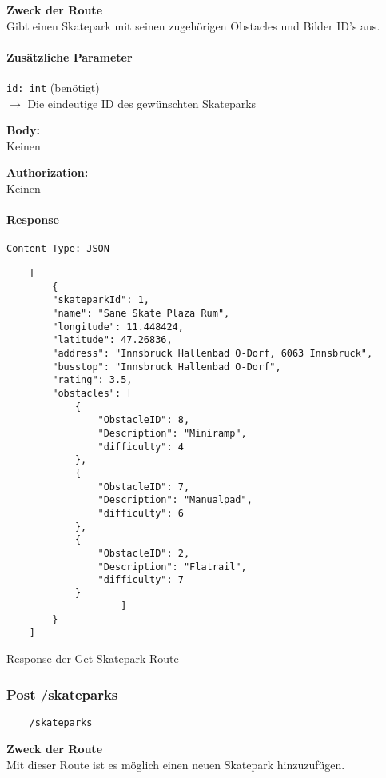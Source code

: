 \textbf{Zweck der Route} \\
Gibt einen Skatepark mit seinen zugehörigen Obstacles und Bilder ID's aus.




\paragraph{Zusätzliche Parameter}
\lstinline{id: int} (benötigt) \\
$\rightarrow$ Die eindeutige ID des gewünschten Skateparks


\textbf{Body:} \\
Keinen

\textbf{Authorization:} \\
Keinen

\paragraph{Response}
\begin{code}
    \lstinline{Content-Type: JSON}
    \begin{lstlisting}
    [
        {
        "skateparkId": 1,
        "name": "Sane Skate Plaza Rum",
        "longitude": 11.448424,
        "latitude": 47.26836,
        "address": "Innsbruck Hallenbad O-Dorf, 6063 Innsbruck",
        "busstop": "Innsbruck Hallenbad O-Dorf",
        "rating": 3.5,
        "obstacles": [
            {
                "ObstacleID": 8,
                "Description": "Miniramp",
                "difficulty": 4
            },
            {
                "ObstacleID": 7,
                "Description": "Manualpad",
                "difficulty": 6
            },
            {
                "ObstacleID": 2,
                "Description": "Flatrail",
                "difficulty": 7
            }
                    ]
        }
    ]
    \end{lstlisting}
    \caption{Response der Get Skatepark-Route}
\end{code}
\pagebreak


\subsubsection{Post /skateparks}

\begin{lstlisting}
    /skateparks
\end{lstlisting}

\textbf{Zweck der Route} \\
Mit dieser Route ist es möglich einen neuen Skatepark hinzuzufügen.





